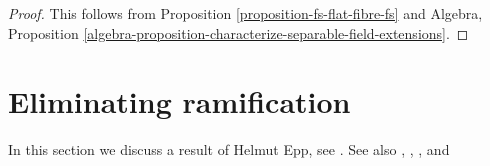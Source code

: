 \begin{proof}
This follows from Proposition \ref{proposition-fs-flat-fibre-fs} and
Algebra, Proposition
\ref{algebra-proposition-characterize-separable-field-extensions}.
\end{proof}






\section{Eliminating ramification}
\label{section-eliminating-ramification}

\noindent
In this section we discuss a result of Helmut Epp, see
\cite{Epp}. See also \cite{Ponomarev}, \cite{Ponomarev-Abhyankar},
\cite{Kuhlmann}, and \cite{ZK}

